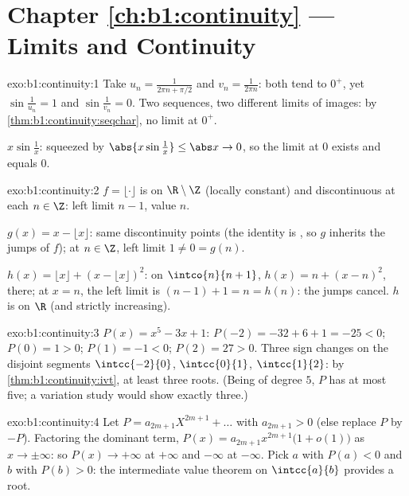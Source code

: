 \section*{Chapter \ref{ch:b1:continuity} --- Limits and Continuity}

\begin{solution}{exo:b1:continuity:1}
Take $u_n = \frac{1}{2\pi n + \pi/2}$ and $v_n = \frac{1}{2\pi n}$:
both tend to $0^+$, yet $\sin\frac{1}{u_n} = 1$ and
$\sin\frac{1}{v_n} = 0$. Two sequences, two different limits of
images: by \cref{thm:b1:continuity:seqchar}, no limit at $0^+$.

$x \sin\frac1x$: squeezed by $\abs{x\sin\frac1x} \leq \abs x \to 0$,
so the limit at $0$ exists and equals $0$.
\end{solution}

\begin{solution}{exo:b1:continuity:2}
$f = \lfloor\cdot\rfloor$ is  on $\R \setminus \Z$
(locally constant) and discontinuous at each $n \in \Z$: left limit
$n - 1$, value $n$.

$g(x) = x - \lfloor x\rfloor$: same discontinuity points (the
identity is , so $g$ inherits the jumps of $f$); at $n \in
\Z$, left limit $1 \neq 0 = g(n)$.

$h(x) = \lfloor x\rfloor + (x - \lfloor x\rfloor)^2$: on $\intco{n}{n
+ 1}$, $h(x) = n + (x - n)^2$,  there; at $x = n$, the left
limit is $(n-1) + 1 = n = h(n)$: the jumps cancel. $h$ is 
on $\R$ (and strictly increasing).
\end{solution}

\begin{solution}{exo:b1:continuity:3}
$P(x) = x^5 - 3x + 1$: $P(-2) = -32 + 6 + 1 = -25 < 0$; $P(0) = 1 >
0$; $P(1) = -1 < 0$; $P(2) = 27 > 0$. Three sign changes on the
disjoint segments $\intcc{-2}{0}$, $\intcc{0}{1}$, $\intcc{1}{2}$:
by \cref{thm:b1:continuity:ivt}, at least three roots. (Being of
degree $5$, $P$ has at most five; a variation study would show
exactly three.)
\end{solution}

\begin{solution}{exo:b1:continuity:4}
Let $P = a_{2m+1}X^{2m+1} + \dots$ with $a_{2m+1} > 0$ (else replace
$P$ by $-P$). Factoring the dominant term, $P(x) = a_{2m+1}
x^{2m+1}\bigl(1 + o(1)\bigr)$ as $x \to \pm\infty$: so $P(x) \to
+\infty$ at $+\infty$ and $-\infty$ at $-\infty$. Pick $a$ with
$P(a) < 0$ and $b$ with $P(b) > 0$: the intermediate value theorem on
$\intcc{a}{b}$ provides a root.
\end{solution}

